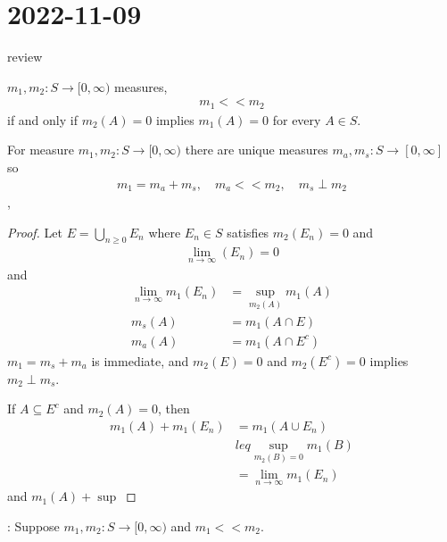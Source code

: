 \section{2022-11-09}

review

\begin{definition}
	$m_1, m_2 : S \to [0, \infty)$ measures,
	\begin{align*}
		m_1 << m_2
	\end{align*} if and only if $m_{2} (A) = 0 $ implies $m_{1} (A) = 0$ for every $A \in S$.
\end{definition}


\begin{theorem}
	For measure $m_1, m_2 : S \to [0, \infty)$ there are unique measures  $m_a, m_{s} :S \to [0, \infty]$ so
	\begin{align*}
		m_1 = m_a + m_s, \quad m_a << m_2, \quad m_s \perp m_2
	\end{align*},
\end{theorem}

\begin{proof}
	Let $E = \bigcup_{n \geq 0} E_{n}$ where $E_{n} \in S$ satisfies 
	 $m_{2} (E_{n}) = 0$ and
	 \begin{align*}
	 	\lim_{n \to \infty} (E_{n}) = 0
	 \end{align*} and
	 \begin{align*}
		 \lim_{n \to \infty} m_{1} (E_{n}) &= \sup_{m_{2} (A)} m_1 (A) \\
		 m_s (A) &= m_1 (A \cap E) \\
		 m_a (A) &= m_{1} (A \cap E^c)
	 \end{align*} 
	 $m_1 = m_s + m_a$ is immediate, and
	 $m_2 (E) = 0$ and $m_2 (E^c) = 0$ implies $m_2 \perp m_s$.

	 If $A \subseteq E^c$ and $m_2 (A) = 0$, then 
	 \begin{align*}
		 m_1 (A) + m_1 (E_n) &= m_1 (A \cup E_n) \\
							 &leq \sup_{m_2 (B) = 0} m_1 (B) \\
							 &= \lim_{n \to \infty} m_1 (E_n)
	 \end{align*} 
	 and $m_1 (A) + \sup$
\end{proof}

\begin{theorem}
	\begin{lemma}: Suppose $m_1, m_2 : S \to [0, \infty)$ and $m_1 << m_2$.
		
	\end{lemma}
\end{theorem}


